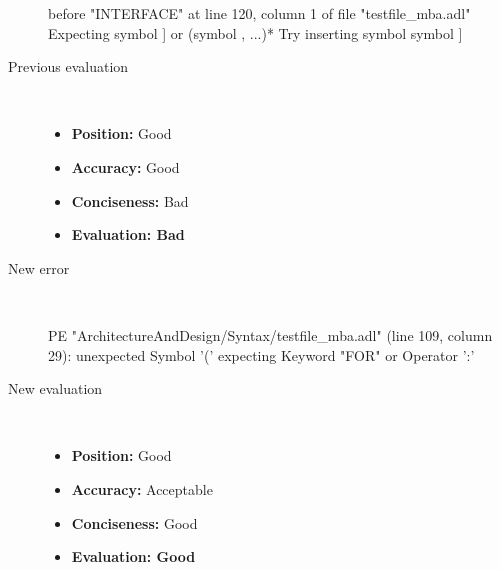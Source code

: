 \begin{description}
\begin{haskell}
before "INTERFACE" at line 120, column 1 of file "testfile_mba.adl"
Expecting symbol ] or (symbol , ...)*
Try inserting symbol symbol ]
\end{haskell}
  \item[Previous evaluation]~\\
    \begin{itemize}
    \item \textbf{Position:} Good
    \item \textbf{Accuracy:} Good
    \item \textbf{Conciseness:} Bad
    \item \textbf{Evaluation: Bad}
    \end{itemize}
  \item[New error]~\\
\begin{haskell}
PE "ArchitectureAndDesign/Syntax/testfile_mba.adl" (line 109, column 29):
unexpected Symbol '('
expecting Keyword "FOR" or Operator ':'\end{haskell}
  \item[New evaluation]~\\
    \begin{itemize}
    \item \textbf{Position:} Good
    \item \textbf{Accuracy:} Acceptable
    \item \textbf{Conciseness:} Good
    \item \textbf{Evaluation: Good}
    \end{itemize}
  \end{description}

\hrulefill

